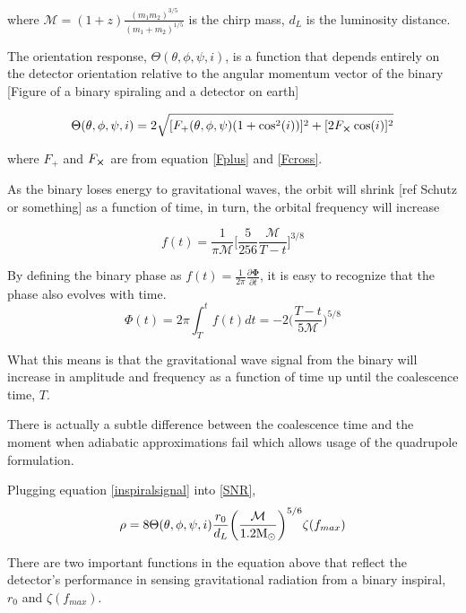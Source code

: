 	where $\mathcal{M} = (1+z) \frac{(m_1 m_2)^{3/5}}{(m_1 + m_2)^{1/5}}$ is the chirp mass, $d_L$ is the luminosity distance. 
	
	
	The orientation response, $\Theta(\theta,\phi,\psi,i)$, is a function that depends entirely on the detector orientation relative to the angular momentum vector of the binary [Figure of a binary spiraling and a detector on earth]
	
	\begin{equation}
	\Theta(\theta,\phi,\psi,i) = 2 \sqrt{	[F_{+}(\theta,\phi,\psi) (1+\cos^2(i)) ]^2 + [2 F_{\cross} \cos(i)]^2 }
	\end{equation}
	
	where $F_{+}$ and $F_{\cross}$ are from equation \ref{Fplus} and \ref{Fcross}.
	
	As the binary loses energy to gravitational waves, the orbit will shrink [ref Schutz or something] as a function of time, in turn, the orbital frequency will increase
	
	\begin{equation}
	f(t) = \frac{1}{\pi \mathcal{M}} \bigg[\frac{5}{256} \frac{\mathcal{M}}{T-t}\bigg]^{3/8} 
	\end{equation}
	
	By defining the binary phase as $f(t) = \frac{1}{2\pi} \frac{\partial \mathbf{\Phi} }{\partial t}$, it is easy to recognize that the phase also evolves with time.
	\begin{equation}
	\Phi(t) = 2\pi \int_{T}^{t} f(t) dt = -2 \bigg( \frac{T-t}{5\mathcal{M}}\bigg)^{5/8}
	\end{equation}
	
	What this means is that the gravitational wave signal from the binary will increase in amplitude and frequency as a function of time up until the coalescence time, $T$.


	There is actually a subtle difference between the coalescence time and the moment when adiabatic approximations fail which allows usage of the quadrupole formulation. 

	Plugging equation \ref{inspiralsignal} into \ref{SNR},
	\begin{equation}
	\rho = 8 \Theta(\theta,\phi,\psi,i) \frac{r_0}{d_L} \bigg(\frac{\mathcal{M}}{1.2 \textup{M}_\odot}\bigg)^{5/6} \zeta(f_{max})
	\end{equation}
	
	There are two important functions in the equation above that reflect the detector's performance in sensing gravitational radiation from a binary inspiral, $r_0$ and $\zeta(f_{max})$.
	
